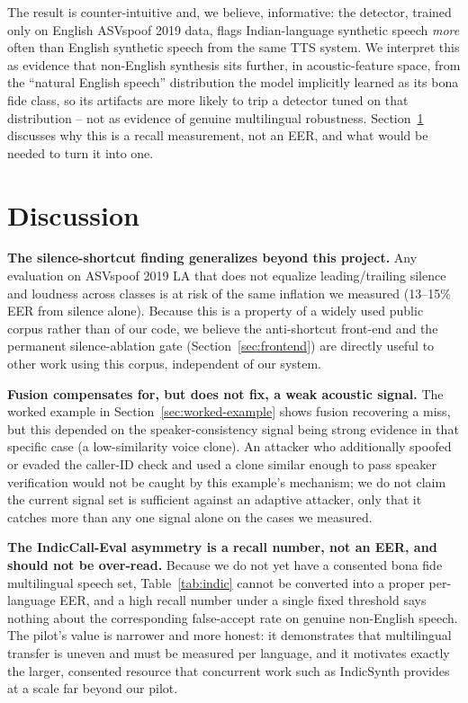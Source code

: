 \documentclass[conference]{IEEEtran}
\begin{document}
The result is counter-intuitive and, we believe, informative: the
detector, trained only on English ASVspoof 2019 data, flags
Indian-language synthetic speech \emph{more} often than English
synthetic speech from the same TTS system. We interpret this as evidence
that non-English synthesis sits further, in acoustic-feature space, from
the ``natural English speech'' distribution the model implicitly
learned as its bona fide class, so its artifacts are more likely to trip
a detector tuned on that distribution -- not as evidence of genuine
multilingual robustness. Section~\ref{sec:discussion} discusses why this
is a recall measurement, not an EER, and what would be needed to turn it
into one.

\section{Discussion}
\label{sec:discussion}

\textbf{The silence-shortcut finding generalizes beyond this project.}
Any evaluation on ASVspoof 2019 LA that does not equalize
leading/trailing silence and loudness across classes is at risk of the
same inflation we measured (13--15\% EER from silence alone). Because
this is a property of a widely used public corpus rather than of our
code, we believe the anti-shortcut front-end and the permanent
silence-ablation gate (Section~\ref{sec:frontend}) are directly useful
to other work using this corpus, independent of our system.

\textbf{Fusion compensates for, but does not fix, a weak acoustic
signal.} The worked example in Section~\ref{sec:worked-example} shows
fusion recovering a miss, but this depended on the speaker-consistency
signal being strong evidence in that specific case (a low-similarity
voice clone). An attacker who additionally spoofed or evaded the
caller-ID check and used a clone similar enough to pass speaker
verification would not be caught by this example's mechanism; we do not
claim the current signal set is sufficient against an adaptive attacker,
only that it catches more than any one signal alone on the cases we
measured.

\textbf{The IndicCall-Eval asymmetry is a recall number, not an EER,
and should not be over-read.} Because we do not yet have a consented
bona fide multilingual speech set, Table~\ref{tab:indic} cannot be
converted into a proper per-language EER, and a high recall number
under a single fixed threshold says nothing about the corresponding
false-accept rate on genuine non-English speech. The pilot's value is
narrower and more honest: it demonstrates that multilingual transfer is
uneven and must be measured per language, and it motivates exactly the
larger, consented resource that concurrent work such as IndicSynth
\cite{indicsynth} provides at a scale far beyond our pilot.
\end{document}
